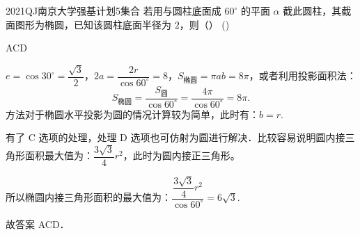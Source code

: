 
\begin{problem}{2021}{QJ}{南京大学强基计划}{5}{集合}
若用与圆柱底面成 $60^\circ$ 的平面 $\alpha$ 截此圆柱，其截面图形为椭圆，已知该圆柱底面半径为 $2$，则（\hspace{1cm}） (\hspace{1cm})
\begin{choices}
\end{choices}
\end{problem}

\begin{answer}
ACD
\end{answer}

\begin{solutions}
$e=\cos 30^\circ=\dfrac{\sqrt{3}}{2}$，$2a=\dfrac{2r}{\cos 60^\circ}=8$，$S_{\text{椭圆}}=\pi ab=8\pi$，或者利用投影面积法：
$$
S_{\text{椭圆}}=\dfrac{S_{\text{圆}}}{\cos 60^\circ}=\dfrac{4\pi}{\cos 60^\circ}=8\pi.
$$
方法对于椭圆水平投影为圆的情况计算较为简单，此时有：$b=r$.

有了 C 选项的处理，处理 D 选项也可仿射为圆进行解决．比较容易说明圆内接三角形面积最大值为：$\dfrac{3\sqrt{3}}{4}r^2$，此时为圆内接正三角形。

所以椭圆内接三角形面积的最大值为：$\dfrac{\dfrac{3\sqrt{3}}{4}r^2}{\cos 60^\circ}=6\sqrt{3}$.

故答案 ACD．
\end{solutions}
